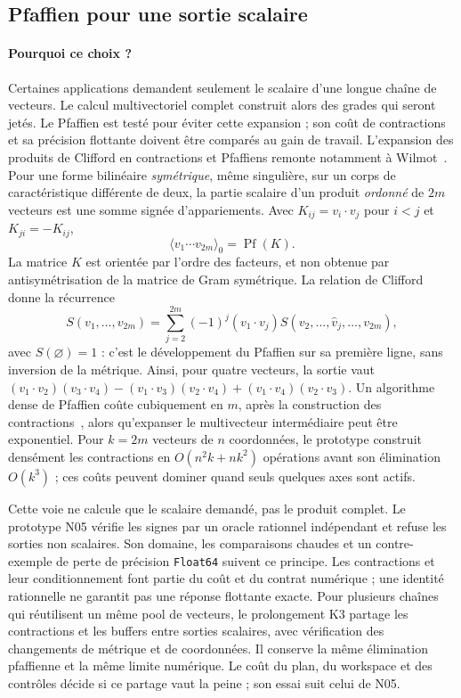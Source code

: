 \documentclass[11pt,a4paper]{article}
\newcommand{\code}[1]{\texttt{#1}}
\begin{document}
\FloatBarrier

\subsection{Pfaffien pour une sortie scalaire}
\paragraph{Pourquoi ce choix ?}
Certaines applications demandent seulement le scalaire d'une longue
chaîne de vecteurs. Le calcul multivectoriel complet construit alors
des grades qui seront jetés. Le Pfaffien est testé pour éviter cette
expansion ; son coût de contractions et sa précision flottante doivent
être comparés au gain de travail.
L'expansion des produits de Clifford en contractions et Pfaffiens remonte
notamment à Wilmot~\cite{wilmotpf,wilmot2026}. Pour une forme bilinéaire
\emph{symétrique}, même singulière, sur un corps de caractéristique
différente de deux, la partie scalaire d'un produit \emph{ordonné} de
$2m$ vecteurs est une somme signée d'appariements. Avec
$K_{ij}=v_i\cdot v_j$ pour $i<j$ et $K_{ji}=-K_{ij}$,
\[
 \langle v_1\cdots v_{2m}\rangle_0=\operatorname{Pf}(K).
\]
La matrice $K$ est orientée par l'ordre des facteurs, et non obtenue par
antisymétrisation de la matrice de Gram symétrique. La relation de Clifford
donne la récurrence
\[
S(v_1,\ldots,v_{2m})=
\sum_{j=2}^{2m}(-1)^j(v_1\cdot v_j)
S(v_2,\ldots,\widehat v_j,\ldots,v_{2m}),
\]
avec $S(\varnothing)=1$ : c'est le développement du Pfaffien sur sa
première ligne, sans inversion de la métrique.
Ainsi, pour quatre vecteurs, la sortie vaut
$(v_1\!\cdot v_2)(v_3\!\cdot v_4)
-(v_1\!\cdot v_3)(v_2\!\cdot v_4)
+(v_1\!\cdot v_4)(v_2\!\cdot v_3)$.
Un algorithme dense de Pfaffien coûte cubiquement en $m$, après la
construction des contractions~\cite{wimmer}, alors qu'expanser le
multivecteur intermédiaire peut être exponentiel.
Pour $k=2m$ vecteurs de $n$ coordonnées, le prototype construit
densément les contractions en
$O(n^2k+nk^2)$ opérations avant son élimination $O(k^3)$ ;
ces coûts peuvent dominer quand seuls quelques axes sont actifs.

Cette voie ne calcule que le scalaire demandé, pas le produit complet.
Le prototype N05 vérifie les signes par un oracle rationnel indépendant
et refuse les sorties non scalaires. Son domaine,
les comparaisons chaudes et un contre-exemple de perte de précision
\code{Float64} suivent ce principe. Les
contractions et leur conditionnement font partie du coût et du contrat
numérique ; une identité rationnelle ne garantit pas une réponse
flottante exacte.
Pour plusieurs chaînes qui réutilisent un même pool de vecteurs, le
prolongement K3 partage les contractions et les buffers entre sorties
scalaires, avec vérification des changements de métrique et de
coordonnées. Il conserve la même élimination pfaffienne
et la même limite numérique. Le coût du plan, du workspace et des
contrôles décide si ce partage vaut la peine ; son essai suit celui de
N05.
\end{document}
